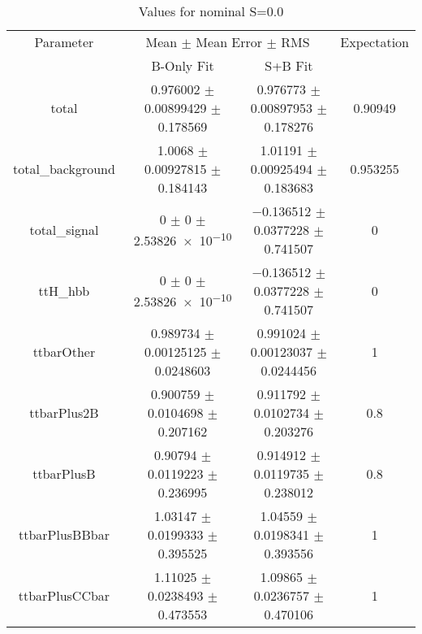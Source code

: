 \begin{table}
\centering
\caption{Values for nominal S=0.0}
\begin{tabular}{cccc}
\toprule
Parameter & \multicolumn{2}{c}{Mean $\pm$ Mean Error $\pm$ RMS} & Expectation\\
 & B-Only Fit & S+B Fit & \\
\midrule
total & \num{0.976002} $\pm$ \num{0.00899429} $\pm$ \num{0.178569} & \num{0.976773} $\pm$ \num{0.00897953} $\pm$ \num{0.178276} & \num{0.90949}\\
total\_background & \num{1.0068} $\pm$ \num{0.00927815} $\pm$ \num{0.184143} & \num{1.01191} $\pm$ \num{0.00925494} $\pm$ \num{0.183683} & \num{0.953255}\\
total\_signal & \num{0} $\pm$ \num{0} $\pm$ \num{2.53826e-10} & \num{-0.136512} $\pm$ \num{0.0377228} $\pm$ \num{0.741507} & \num{0}\\
ttH\_hbb & \num{0} $\pm$ \num{0} $\pm$ \num{2.53826e-10} & \num{-0.136512} $\pm$ \num{0.0377228} $\pm$ \num{0.741507} & \num{0}\\
ttbarOther & \num{0.989734} $\pm$ \num{0.00125125} $\pm$ \num{0.0248603} & \num{0.991024} $\pm$ \num{0.00123037} $\pm$ \num{0.0244456} & \num{1}\\
ttbarPlus2B & \num{0.900759} $\pm$ \num{0.0104698} $\pm$ \num{0.207162} & \num{0.911792} $\pm$ \num{0.0102734} $\pm$ \num{0.203276} & \num{0.8}\\
ttbarPlusB & \num{0.90794} $\pm$ \num{0.0119223} $\pm$ \num{0.236995} & \num{0.914912} $\pm$ \num{0.0119735} $\pm$ \num{0.238012} & \num{0.8}\\
ttbarPlusBBbar & \num{1.03147} $\pm$ \num{0.0199333} $\pm$ \num{0.395525} & \num{1.04559} $\pm$ \num{0.0198341} $\pm$ \num{0.393556} & \num{1}\\
ttbarPlusCCbar & \num{1.11025} $\pm$ \num{0.0238493} $\pm$ \num{0.473553} & \num{1.09865} $\pm$ \num{0.0236757} $\pm$ \num{0.470106} & \num{1}\\
\bottomrule
\end{tabular}
\end{table}
